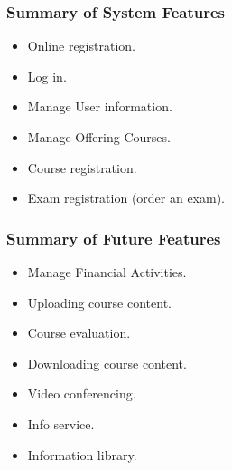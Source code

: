 \documentclass{scrartcl}
\begin{document}
  	
  	\subsubsection{Summary of System Features}
  	
  	\begin{itemize}
  	\item Online registration.
  	\item Log in.
  	\item Manage User information.
  	\item Manage Offering Courses.
  	\item Course registration.
  	\item Exam registration (order an exam).
  	\end{itemize}
  	
  	\subsubsection{Summary of Future Features}
  	\begin{itemize}
  	\item Manage Financial Activities.
  	\item Uploading course content.
  	\item Course evaluation.
  	\item Downloading course content.
  	\item Video conferencing.
  	\item Info service.
  	\item Information library.
  	\end{itemize}
  	
  	
\end{document}
